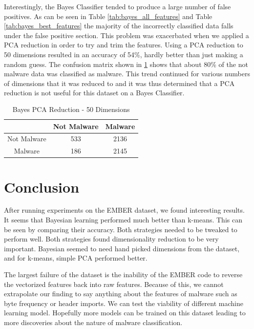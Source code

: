 \documentclass[12pt]{article}
\begin{document}
\par
Interestingly, the Bayes Classifier tended to produce a large number of false positives. As can be seen in Table \ref{tab:bayes_all_features} and Table \ref{tab:bayes_best_features} the majority of the incorrectly classified data falls under the false positive section. This problem was exacerbated when we applied a PCA reduction in order to try and trim the features. Using a PCA reduction to 50 dimensions resulted in an accuracy of 54\%, hardly better than just making a random guess. The confusion matrix shown in \ref{tab:bayes_pca_reduction} shows that about 80\% of the not malware data was classified as malware. This trend continued for various numbers of dimensions that it was reduced to and it was thus determined that a PCA reduction is not useful for this dataset on a Bayes Classifier.

\begin{table}[]
    \centering
    \begin{tabular}{|c|c|c|}
        \hline
         & Not Malware & Malware  \\
         \hline
        Not Malware & 533 & 2136 \\
        \hline
        Malware & 186 & 2145 \\
        \hline
    \end{tabular}
    \caption{Bayes PCA Reduction - 50 Dimensions}
    \label{tab:bayes_pca_reduction}
\end{table}
\section{Conclusion}
\par
After running experiments on the EMBER dataset, we found interesting results. It seems that Bayesian learning performed much better than k-means. This can be seen by comparing their accuracy. Both strategies needed to be tweaked to perform well.
Both strategies found dimensionality reduction to be very important. Bayesian seemed to need hand picked dimensions from the dataset, and for k-means, simple PCA performed better.
\par
The largest failure of the dataset is the inability of the EMBER code to reverse the vectorized features back into raw features. Because of this, we cannot extrapolate our finding to say anything about the features of malware such as byte frequency or header imports. We can test the viability of different machine learning model.
Hopefully more models can be trained on this dataset leading to more discoveries about the nature of malware classification.
\end{document}

